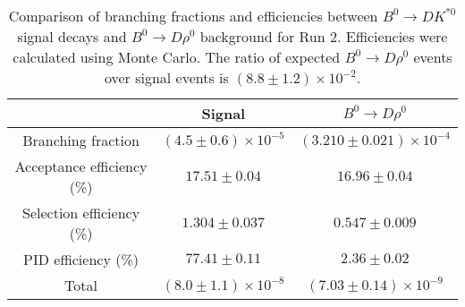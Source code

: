 \begin{table}
    \centering
    \begin{tabular}{ccc}
        \toprule
        & Signal & $B^0 \to D\rho^0$ \\
        \midrule
        Branching fraction & $(4.5 \pm 0.6) \times 10^{-5}$ & $(3.210 \pm 0.021) \times 10^{-4}$ \\
        Acceptance efficiency (\%) & $17.51 \pm 0.04$ & $16.96 \pm 0.04$ \\
        Selection efficiency (\%) & $1.304 \pm 0.037$ & $0.547 \pm 0.009$ \\
        PID efficiency (\%) & $77.41 \pm 0.11$ & $2.36 \pm 0.02$ \\
        \midrule
        Total & $(8.0 \pm 1.1) \times 10^{-8}$ & $(7.03 \pm 0.14) \times 10^{-9}$ \\
        \bottomrule
        \end{tabular}
        \caption{Comparison of branching fractions and efficiencies between $B^0 \to DK^{*0}$ signal decays and $B^0 \to D\rho^0$ background for Run 2. Efficiencies were calculated using Monte Carlo. The ratio of expected $B^0 \to D\rho^0$ events over signal events is $(8.8 \pm 1.2) \times 10^{-2}$.}
\label{tab:rho_efficiency_run2}
\end{table}
